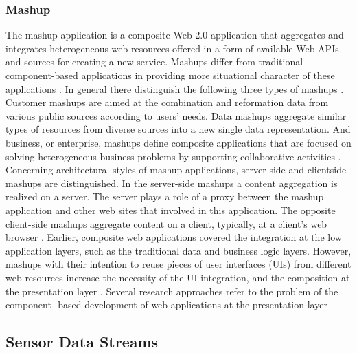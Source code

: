\subsubsection {Mashup}
The mashup application is a composite Web 2.0 application that aggregates and
integrates heterogeneous web resources offered in a form of available Web APIs and
sources for creating a new service. Mashups differ from traditional component-based
applications in providing more situational character of these applications \cite{yu2008understanding}.
In general there distinguish the following three types of mashups \cite{peenikal2009mashups}. 
Customer mashups are aimed at the combination and reformation data from various
public sources according to users’ needs. Data mashups aggregate similar types of
resources from diverse sources into a new single data representation. And business,
or enterprise, mashups define composite applications that are focused on solving
heterogeneous business problems by supporting collaborative activities \cite{hoyer2008enterprise}.
Concerning architectural styles of mashup applications,
 server-side and clientside mashups are distinguished. In the server-side mashups a content aggregation
is realized on a server. The server plays a role of a proxy between the
mashup application and other web sites that involved in this application. The
opposite client-side mashups aggregate content on a client, typically, at a client’s
web browser \cite{ort2007mashup}.
Earlier, composite web applications covered the integration at the low application
layers, such as the traditional data and business logic layers. However, mashups with
their intention to reuse pieces of user interfaces (UIs) from different web resources
increase the necessity of the UI integration, and the composition at the presentation
layer \cite{daniel2007understanding}. Several research approaches refer to the problem of the component-
based development of web applications at the presentation layer \cite{pietschmann2010application}.
\subsection {Sensor Data Streams}

